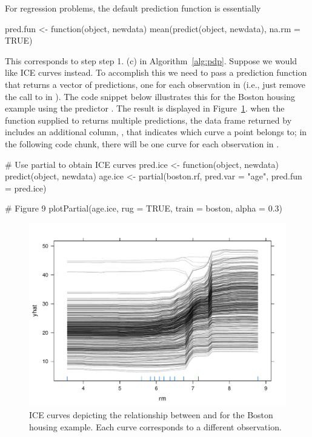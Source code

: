 For regression problems, the default prediction function is essentially
\begin{example}
pred.fun <- function(object, newdata) {
  mean(predict(object, newdata), na.rm = TRUE)
}
\end{example}
This corresponds to step step 1. (c) in Algorithm~\ref{alg:pdp}. Suppose we would like ICE curves instead. To accomplish this we need to pass a prediction function that returns a vector of predictions, one for each observation in  (i.e., just remove the call to  in ). The code snippet below illustrates this for the Boston housing example using the predictor . The result is displayed in Figure~\ref{fig:ice_boston}.  when the function supplied to  returns multiple predictions, the data frame returned by  includes an additional column, , that indicates which curve a point belongs to; in the following code chunk, there will be one curve for each observation in .
\begin{example}
# Use partial to obtain ICE curves
pred.ice <- function(object, newdata) predict(object, newdata)
age.ice <- partial(boston.rf, pred.var = "age", pred.fun = pred.ice)

# Figure 9
plotPartial(age.ice, rug = TRUE, train = boston, alpha = 0.3)
\end{example}
\begin{figure}[!htbp]
  \centering
  \includegraphics[width=0.8\linewidth]{ice_boston}
  \caption{ICE curves depicting the relationship between  and  for the Boston housing example. Each curve corresponds to a different observation.}
  \label{fig:ice_boston}
\end{figure}

